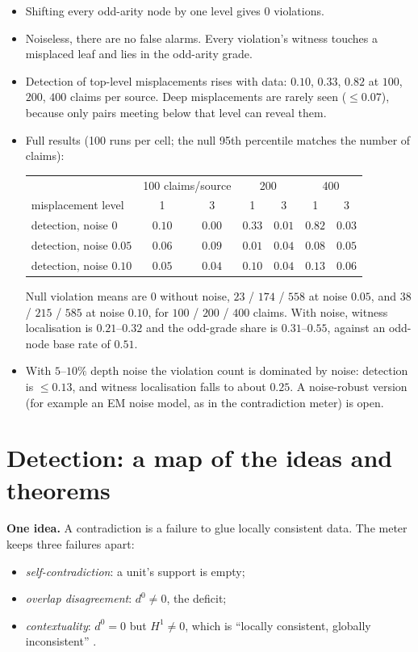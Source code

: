 \documentclass[11pt]{article}
\theoremstyle{definition}
\theoremstyle{remark}
\begin{document}
\begin{itemize}
  \item Shifting every odd-arity node by one level gives $0$ violations.
  \item Noiseless, there are no false alarms. Every violation's witness touches a misplaced leaf and lies in the odd-arity grade.
  \item Detection of top-level misplacements rises with data: $0.10$, $0.33$, $0.82$ at $100$, $200$, $400$ claims per source. Deep misplacements are rarely seen ($\le0.07$), because only pairs meeting below that level can reveal them.
  \item Full results (100 runs per cell; the null 95th percentile matches the number of claims):
  \begin{center}\small
  \begin{tabular}{lcccccc}
  \toprule
  & \multicolumn{2}{c}{100 claims/source} & \multicolumn{2}{c}{200} & \multicolumn{2}{c}{400}\\
  misplacement level & 1 & 3 & 1 & 3 & 1 & 3\\
  \midrule
  detection, noise $0$ & $0.10$ & $0.00$ & $0.33$ & $0.01$ & $0.82$ & $0.03$\\
  detection, noise $0.05$ & $0.06$ & $0.09$ & $0.01$ & $0.04$ & $0.08$ & $0.05$\\
  detection, noise $0.10$ & $0.05$ & $0.04$ & $0.10$ & $0.04$ & $0.13$ & $0.06$\\
  \bottomrule
  \end{tabular}
  \end{center}
  Null violation means are $0$ without noise, $23$ / $174$ / $558$ at noise $0.05$, and $38$ / $215$ / $585$ at noise $0.10$, for $100$ / $200$ / $400$ claims. With noise, witness localisation is $0.21$--$0.32$ and the odd-grade share is $0.31$--$0.55$, against an odd-node base rate of $0.51$.
  \item With $5$--$10\%$ depth noise the violation count is dominated by noise: detection is $\le0.13$, and witness localisation falls to about $0.25$. A noise-robust version (for example an EM noise model, as in the contradiction meter) is open.
\end{itemize}

\section{Detection: a map of the ideas and theorems}\label{sec:detmap}
\textbf{One idea.} A contradiction is a failure to glue locally consistent data. The meter keeps three failures apart:
\begin{itemize}
  \item \emph{self-contradiction}: a unit's support is empty;
  \item \emph{overlap disagreement}: $d^0\neq0$, the deficit;
  \item \emph{contextuality}: $d^0=0$ but $H^1\neq0$, which is ``locally consistent, globally inconsistent'' \cite{abramsky20}.
\end{itemize}
\end{document}
